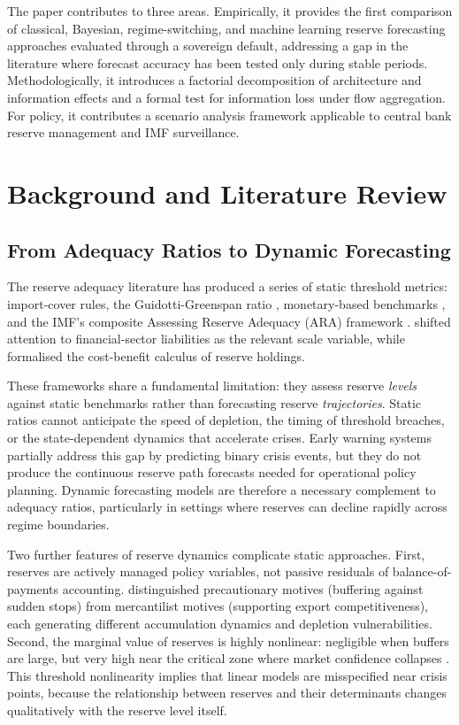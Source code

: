 \documentclass[12pt,a4paper]{article}
\begin{document}
The paper contributes to three areas. Empirically, it provides the first comparison of classical, Bayesian, regime-switching, and machine learning reserve forecasting approaches evaluated through a sovereign default, addressing a gap in the literature where forecast accuracy has been tested only during stable periods. Methodologically, it introduces a factorial decomposition of architecture and information effects and a formal test for information loss under flow aggregation. For policy, it contributes a scenario analysis framework applicable to central bank reserve management and IMF surveillance.

\section{Background and Literature Review}

\subsection{From Adequacy Ratios to Dynamic Forecasting}

The reserve adequacy literature has produced a series of static threshold metrics: import-cover rules, the Guidotti-Greenspan ratio \citep{Greenspan1999}, monetary-based benchmarks \citep{Calvo1996,Wijnholds2001}, and the IMF's composite Assessing Reserve Adequacy (ARA) framework \citep{IMF2011,IMF2015}. \cite{Obstfeld2010} shifted attention to financial-sector liabilities as the relevant scale variable, while \cite{JeanneRanciere2011} formalised the cost-benefit calculus of reserve holdings.

These frameworks share a fundamental limitation: they assess reserve \textit{levels} against static benchmarks rather than forecasting reserve \textit{trajectories}. Static ratios cannot anticipate the speed of depletion, the timing of threshold breaches, or the state-dependent dynamics that accelerate crises. Early warning systems \citep{KaminskyLizondoReinhart1998,FrankelSaravelos2012} partially address this gap by predicting binary crisis events, but they do not produce the continuous reserve path forecasts needed for operational policy planning. Dynamic forecasting models are therefore a necessary complement to adequacy ratios, particularly in settings where reserves can decline rapidly across regime boundaries.

Two further features of reserve dynamics complicate static approaches. First, reserves are actively managed policy variables, not passive residuals of balance-of-payments accounting. \cite{AizenmanLee2007} distinguished precautionary motives (buffering against sudden stops) from mercantilist motives (supporting export competitiveness), each generating different accumulation dynamics and depletion vulnerabilities. Second, the marginal value of reserves is highly nonlinear: negligible when buffers are large, but very high near the critical zone where market confidence collapses \citep{JeanneRanciere2011}. This threshold nonlinearity implies that linear models are misspecified near crisis points, because the relationship between reserves and their determinants changes qualitatively with the reserve level itself.
\end{document}
